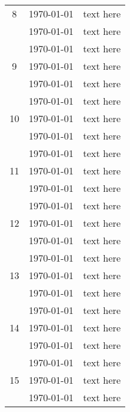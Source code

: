 \documentclass[11pt]{article}
\begin{document}
{\begin{center}
\begin{longtable}{| c | c | c |}
			\hline
			8 & \printyearoff\AdvanceDate[\fpeval{(7*7)+0}]\today & text here  \\
			& \printyearoff\AdvanceDate[\fpeval{(7*7)+2}]\today & text here \\
			& \printyearoff\AdvanceDate[\fpeval{(7*7)+4}]\today & text here \\
			\hline
			9 & \printyearoff\AdvanceDate[\fpeval{(7*8)+0}]\today & text here  \\
			& \printyearoff\AdvanceDate[\fpeval{(7*8)+2}]\today & text here \\
			& \printyearoff\AdvanceDate[\fpeval{(7*8)+4}]\today & text here \\
			\hline
			10 & \printyearoff\AdvanceDate[\fpeval{(7*9)+0}]\today & text here  \\
			& \printyearoff\AdvanceDate[\fpeval{(7*9)+2}]\today & text here \\
			& \printyearoff\AdvanceDate[\fpeval{(7*9)+4}]\today & text here \\
			\hline
			11 & \printyearoff\AdvanceDate[\fpeval{(7*10)+0}]\today & text here \\
			& \printyearoff\AdvanceDate[\fpeval{(7*10)+2}]\today & text here \\
			& \printyearoff\AdvanceDate[\fpeval{(7*10)+4}]\today & text here \\
			\hline
			12 & \printyearoff\AdvanceDate[\fpeval{(7*11)+0}]\today & text here \\
			& \printyearoff\AdvanceDate[\fpeval{(7*11)+2}]\today & text here \\
			& \printyearoff\AdvanceDate[\fpeval{(7*11)+4}]\today & text here \\
			\hline
			13 & \printyearoff\AdvanceDate[\fpeval{(7*12)+0}]\today & text here \\
			& \printyearoff\AdvanceDate[\fpeval{(7*12)+2}]\today & text here \\
			& \printyearoff\AdvanceDate[\fpeval{(7*12)+4}]\today & text here \\
			\hline
			14 & \printyearoff\AdvanceDate[\fpeval{(7*13)+0}]\today & text here \\
			& \printyearoff\AdvanceDate[\fpeval{(7*13)+2}]\today & text here \\
			& \printyearoff\AdvanceDate[\fpeval{(7*13)+4}]\today & text here \\
			\hline
			15 & \printyearoff\AdvanceDate[\fpeval{(7*14)+0}]\today & text here \\
			& \printyearoff\AdvanceDate[\fpeval{(7*14)+2}]\today & text here \\

\end{longtable}
\end{center}}
\end{document}
